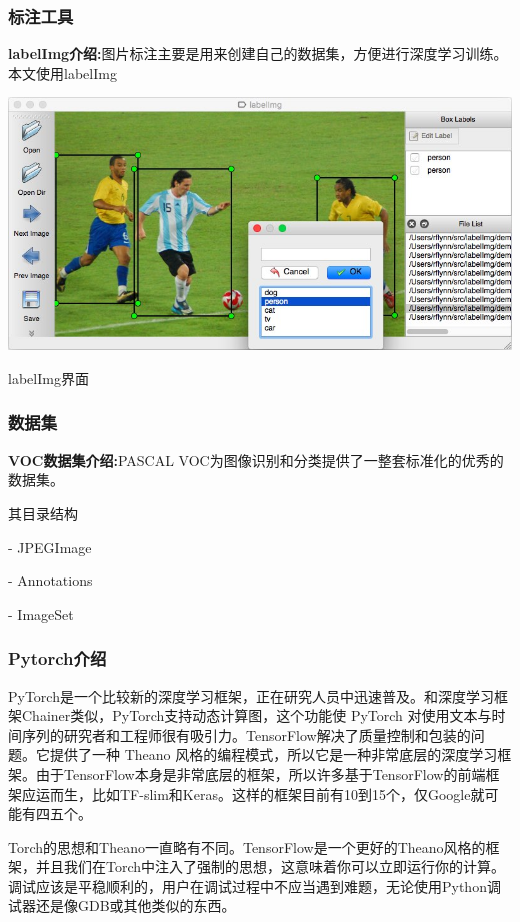 \subsubsection{标注工具}
\textbf{labelImg介绍:}图片标注主要是用来创建自己的数据集，方便进行深度学习训练。本文使用labelImg
\begin{uscfigure}
	\includegraphics[width=\textwidth]{./Pictures/labelimg.jpg}	
	\caption{labelImg界面}
\end{uscfigure}
\subsubsection{数据集}
\textbf{VOC数据集介绍:}PASCAL VOC为图像识别和分类提供了一整套标准化的优秀的数据集。

其目录结构

- JPEGImage

- Annotations

- ImageSet

\subsubsection{Pytorch介绍}
PyTorch是一个比较新的深度学习框架，正在研究人员中迅速普及。和深度学习框架Chainer类似，PyTorch支持动态计算图，这个功能使 PyTorch 对使用文本与时间序列的研究者和工程师很有吸引力。TensorFlow解决了质量控制和包装的问题。它提供了一种 Theano 风格的编程模式，所以它是一种非常底层的深度学习框架。由于TensorFlow本身是非常底层的框架，所以许多基于TensorFlow的前端框架应运而生，比如TF-slim和Keras。这样的框架目前有10到15个，仅Google就可能有四五个。

Torch的思想和Theano一直略有不同。TensorFlow是一个更好的Theano风格的框架，并且我们在Torch中注入了强制的思想，这意味着你可以立即运行你的计算。调试应该是平稳顺利的，用户在调试过程中不应当遇到难题，无论使用Python调试器还是像GDB或其他类似的东西。